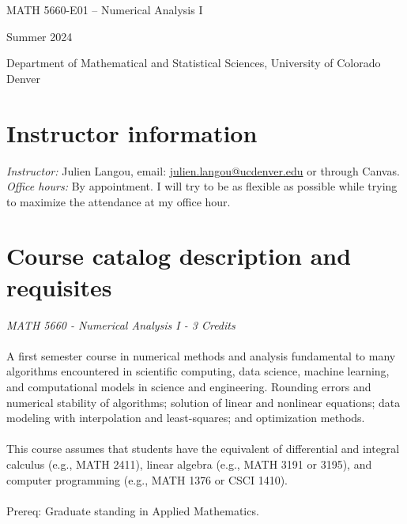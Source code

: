 \documentclass[letterpaper,10pt]{article}
\newcommand{\mailto}[1]{\href{mailto:#1}{#1}}
\begin{document}
\begin{center}{\LARGE
MATH 5660-E01 -- Numerical Analysis I
}
\bigskip

Summer 2024


Department of Mathematical and Statistical Sciences, University of Colorado Denver
\end{center}\vspace*{-1em}


\section*{Instructor information}

\emph{Instructor:} Julien Langou,
email: \mailto{julien.langou@ucdenver.edu} or through Canvas.\\

\emph{Office hours:} By appointment. I will try to be as
flexible as possible while trying to maximize the attendance at my office hour.\\

\medskip

\section*{Course catalog description and requisites}


\emph{MATH 5660 -  Numerical Analysis I - 3 Credits}\\
\\
A first semester course in numerical methods and analysis fundamental to many
algorithms encountered in scientific computing, data science, machine learning,
and computational models in science and engineering. Rounding errors and
numerical stability of algorithms; solution of linear and nonlinear equations;
data modeling with interpolation and least-squares; and optimization methods.\\
\\
This course assumes that students have the equivalent of differential and
integral calculus (e.g., MATH 2411), linear algebra (e.g., MATH 3191 or 3195),
and computer programming (e.g., MATH 1376 or CSCI 1410).\\
\\
Prereq: Graduate standing in Applied Mathematics.\\ 
\\
\end{document}
